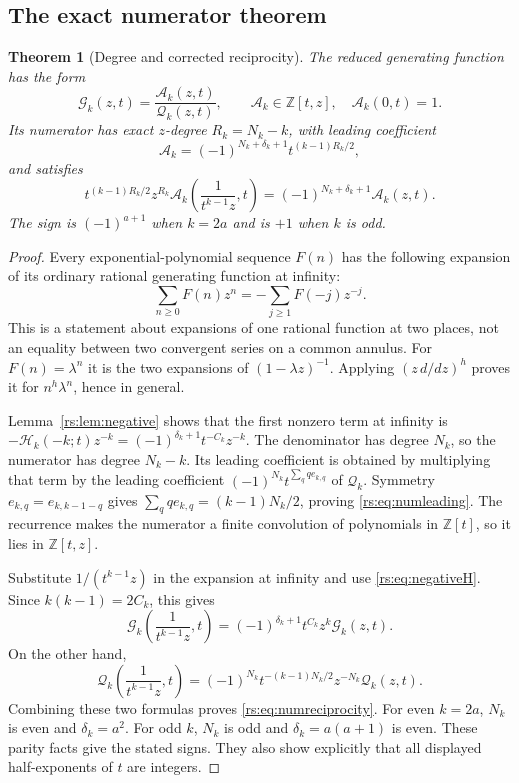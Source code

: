 \documentclass[11pt]{article}
\newtheorem{theorem}{Theorem}[section]
\theoremstyle{definition}
\theoremstyle{remark}
\newcommand{\Z}{\mathbb Z}
\newcommand{\Ht}{\mathcal H}
\newcommand{\QQ}{\mathscr Q}
\newcommand{\AN}{\mathscr A}
\newcommand{\GG}{\mathscr G}
\theoremstyle{definition}
\theoremstyle{plain}
\numberwithin{equation}{section}
\begin{document}
\subsection{The exact numerator theorem}
\begin{theorem}[Degree and corrected reciprocity]
\label{rs:thm:numerator}
The reduced generating function has the form
\begin{equation}
 \GG_k(z,t)=\frac{\AN_k(z,t)}{\QQ_k(z,t)},\qquad
 \AN_k\in\Z[t,z],\quad \AN_k(0,t)=1.
 \label{rs:eq:Gfraction}
\end{equation}
Its numerator has exact $z$-degree $R_k=N_k-k$, with leading coefficient
\begin{equation}
 [z^{R_k}]\AN_k=(-1)^{N_k+\delta_k+1}t^{(k-1)R_k/2},
 \label{rs:eq:numleading}
\end{equation}
and satisfies
\begin{equation}
 \boxed{\displaystyle
 t^{(k-1)R_k/2}z^{R_k}
 \AN_k\!\left(\frac1{t^{k-1}z},t\right)
 =(-1)^{N_k+\delta_k+1}\AN_k(z,t).}
 \label{rs:eq:numreciprocity}
\end{equation}
The sign is $(-1)^{a+1}$ when $k=2a$ and is $+1$ when $k$ is odd.
\end{theorem}
\begin{proof}
Every exponential-polynomial sequence $F(n)$ has the following expansion
of its ordinary rational generating function at infinity:
\begin{equation}
 \sum_{n\ge0}F(n)z^n=-\sum_{j\ge1}F(-j)z^{-j}.
 \label{rs:eq:infinity}
\end{equation}
This is a statement about expansions of one rational function at two
places, not an equality between two convergent series on a common annulus.
For $F(n)=\lambda^n$ it is the two expansions of $(1-\lambda z)^{-1}$.
Applying $(z\,d/dz)^h$ proves it for $n^h\lambda^n$, hence in general.

Lemma~\ref{rs:lem:negative} shows that the first nonzero term at infinity is
$-\Ht_k(-k;t)z^{-k}=(-1)^{\delta_k+1}t^{-C_k}z^{-k}$.
The denominator has degree $N_k$, so the numerator has degree $N_k-k$.
Its leading coefficient is obtained by multiplying that term by the leading
coefficient $(-1)^{N_k}t^{\sum_q q e_{k,q}}$ of $\QQ_k$.
Symmetry $e_{k,q}=e_{k,k-1-q}$ gives
$\sum_q q e_{k,q}=(k-1)N_k/2$, proving \eqref{rs:eq:numleading}.
The recurrence makes the numerator a finite convolution of polynomials in
$\Z[t]$, so it lies in $\Z[t,z]$.

Substitute $1/(t^{k-1}z)$ in the expansion at infinity and use
\eqref{rs:eq:negativeH}. Since $k(k-1)=2C_k$, this gives
\begin{equation}
 \GG_k\!\left(\frac1{t^{k-1}z},t\right)
 =(-1)^{\delta_k+1}t^{C_k}z^k\GG_k(z,t).
 \label{rs:eq:Greciprocity}
\end{equation}
On the other hand,
\[
 \QQ_k\!\left(\frac1{t^{k-1}z},t\right)
 =(-1)^{N_k}t^{-(k-1)N_k/2}z^{-N_k}\QQ_k(z,t).
\]
Combining these two formulas proves \eqref{rs:eq:numreciprocity}.
For even $k=2a$, $N_k$ is even and $\delta_k=a^2$.
For odd $k$, $N_k$ is odd and $\delta_k=a(a+1)$ is even.
These parity facts give the stated signs. They also show explicitly that
all displayed half-exponents of $t$ are integers.
\end{proof}
\end{document}
